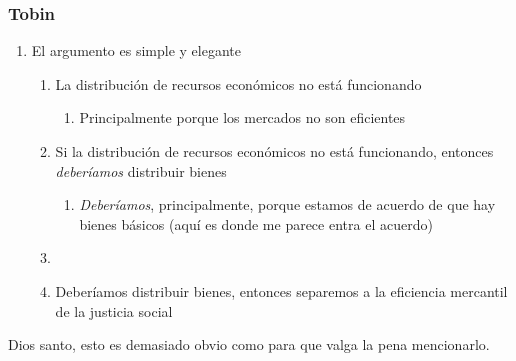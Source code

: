 \documentclass{beamer}
\begin{document}
\begin{frame}
\frametitle{Tobin}
    \begin{enumerate}
    \item El argumento es simple y elegante
        \begin{enumerate}
        \item La distribución de recursos económicos no está funcionando
            \begin{enumerate}
            \item Principalmente porque los mercados no son eficientes
            \end{enumerate}
    \item Si la distribución de recursos económicos no está funcionando, entonces \emph{deberíamos} distribuir bienes
        \begin{enumerate}
        \item \emph{Deberíamos}, principalmente, porque estamos de acuerdo de que hay bienes básicos (aquí es donde me parece entra el acuerdo)
        \end{enumerate}
  \item \item{Deberíamos distribuir bienes}, entonces separemos a la eficiencia mercantil de la justicia social
  \end{enumerate}
  \end{enumerate}
\end{frame}


\begin{frame}[standout]
Dios santo, esto es demasiado obvio como para que valga la pena mencionarlo.
\end{frame}


\end{document}
